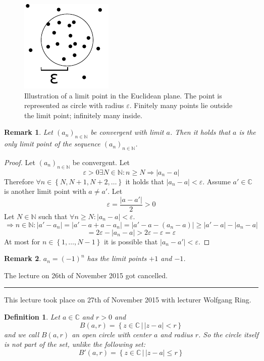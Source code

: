 \documentclass[a4paper,landscape,twocolumn]{article}
\newtheorem{defi}{Definition}
\newtheorem{rem}{Remark}
\newcommand\set[1]{\left\{#1\right\}}
\newcommand\setdef[2]{\left\{#1\,|\,#2\right\}}
\newcommand\abs[1]{\left|#1\right|}
\newcommand\seq[1]{{\left(#1\right)}_{n \in \mathbb N}}
\newcommand\meta[3]{\hrule{} This #1 took place on #2 with lecturer #3.\par}
\begin{document}
\begin{figure}[!t]
  \begin{center}
    \includegraphics{img/limit_point.pdf}
    \caption{
      Illustration of a limit point in the Euclidean plane.
      The point is represented as circle with radius $\varepsilon$.
      Finitely many points lie outside the limit point; infinitely many inside.
    }
  \end{center}
\end{figure}

\begin{rem}
  Let $\seq{a_n}$ be convergent with limit $a$.
  Then it holds that $a$ is the only limit point of the sequence $\seq{a_n}$.
\end{rem}

\begin{proof}
  Let $\seq{a_n}$ be convergent. Let
  \[ \varepsilon > 0 \exists N \in \mathbb N: n \geq N \Rightarrow \abs{a_n - a} \]
  Therefore $\forall n \in \set{N, N+1, N+2, \dots}$ it holds that $\abs{a_n - a} < \varepsilon$.
  Assume $a' \in \mathbb C$ is another limit point with $a \neq a'$.
  Let
  \[ \varepsilon = \frac{\abs{a - a'}}{2} > 0 \]
  Let $N \in \mathbb N$ such that $\forall n \geq N: \abs{a_n - a} < \varepsilon$.
  \[
    \Rightarrow n \in \mathbb N: \abs{a' - a_n}
      = \abs{a' - a + a - a_n}
      = \abs{a' - a - (a_n - a)} \geq \abs{a' - a} - \abs{a_n - a}
  \] \[
      = 2\varepsilon - \abs{a_n - a} > 2\varepsilon - \varepsilon
      = \varepsilon
  \]
  At most for $n \in \set{1, \dots, N-1}$ it is possible that $\abs{a_n - a'} < \varepsilon$.
\end{proof}

\begin{rem}
  $a_n = (-1)^n$ has the limit points $+1$ and $-1$.
\end{rem}

The lecture on 26th of November 2015 got cancelled.

\meta{lecture}{27th of November 2015}{Wolfgang Ring}

\begin{defi}
  Let $a \in \mathbb C$ and $r > 0$ and
  \[ B(a, r) = \setdef{z \in \mathbb C}{\abs{z - a} < r} \]
  and we call $B(a, r)$ an \emph{open} circle with center $a$ and radius $r$.
  So the circle itself is not part of the set, unlike the following set:
  \[ B'(a, r) = \setdef{z \in \mathbb C}{\abs{z - a} \leq r} \]
\end{defi}
\end{document}
